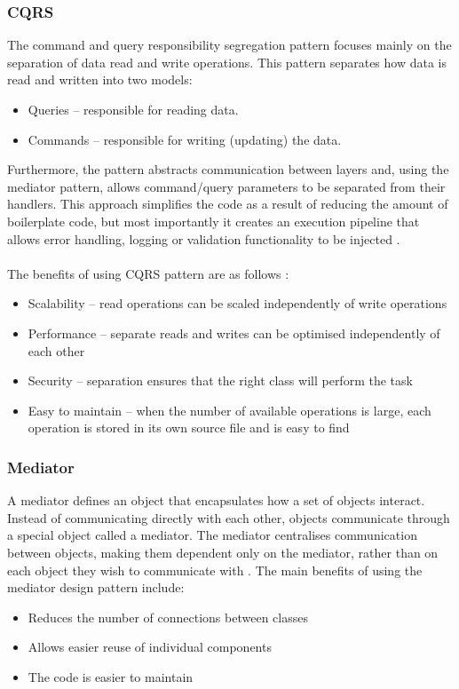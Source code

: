 \documentclass[a4paper,twoside,12pt]{book}
\begin{document}
\subsubsection{CQRS}
The command and query responsibility segregation pattern focuses mainly on the separation of data read and write operations. This pattern separates how data is read and written into two models:  
\begin{itemize}
\item Queries -- responsible for reading data.
\item Commands -- responsible for writing (updating) the data.
\end{itemize}

Furthermore, the pattern abstracts communication between layers and, using the mediator pattern, allows command/query parameters to be separated from their handlers. This approach simplifies the code as a result of reducing the amount of boilerplate code, but most importantly it creates an execution pipeline that allows error handling, logging or validation functionality to be injected \cite{bib:CQRS}. 
\paragraph{}
The benefits of using CQRS pattern are as follows
\cite{bib:CQRS}: 
\begin{itemize}
\item Scalability -- read operations can be scaled independently of write operations
\item Performance -- separate reads and writes can be optimised independently of each other
\item Security -- separation ensures that the right class will perform the task
\item Easy to maintain -- when the number of available operations is large, each operation is stored in its own source file and is easy to find
\end{itemize}

\subsubsection{Mediator}
A mediator defines an object that encapsulates how a set of objects interact. Instead of communicating directly with each other, objects communicate through a special object called a mediator. The mediator centralises communication between objects, making them dependent only on the mediator, rather than on each object they wish to communicate with \cite{bib:mediator}. The main benefits of using the mediator design pattern include: 
\begin{itemize}
\item Reduces the number of connections between classes
\item Allows easier reuse of individual components
\item The code is easier to maintain
\end{itemize}
\end{document}
